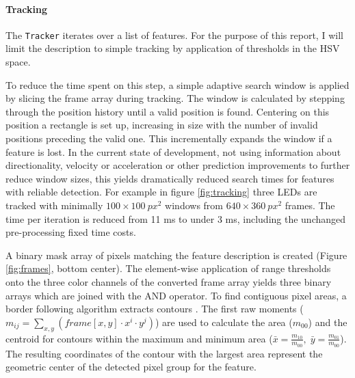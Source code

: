 \paragraph{Tracking}
\label{sec:Tracking}
The \texttt{Tracker} iterates over a list of features. For the purpose of this report, I will limit the description to simple tracking by application of thresholds in the HSV space. 

To reduce the time spent on this step, a simple adaptive search window is applied by slicing the frame array during tracking. The window is calculated by stepping through the position history until a valid position is found. Centering on this position a rectangle is set up, increasing in size with the number of invalid positions preceding the valid one. This incrementally expands the window if a feature is lost. In the current state of development, not using information about directionality, velocity or acceleration or other prediction improvements to further reduce window sizes, this yields dramatically reduced search times for features with reliable detection. For example in figure \ref{fig:tracking} three LEDs are tracked with minimally $100\times100~px^2$ windows from $640\times360~px^2$ frames. The time per iteration is reduced from 11 ms to under 3 ms, including the unchanged pre-processing fixed time costs.

A binary mask array of pixels matching the feature description is created (Figure \ref{fig:frames}, bottom center). The element-wise application of range thresholds onto the three color channels of the converted frame array yields three binary arrays which are joined with the AND operator. To find contiguous pixel areas, a border following algorithm extracts contours \cite{Suzuki1985}. The first raw moments ($m_{ij}=\sum_{x,y}(frame[x, y] \cdot x^i \cdot y^j)$) are used to calculate the area ($m_{00}$) and the centroid for contours within the maximum and minimum area ($\bar{x} = \frac{m_{10}}{m_{00}} , \; \bar{y} = \frac{m_{01}}{m_{00}}$). The resulting coordinates of the contour with the largest area represent the geometric center of the detected pixel group for the feature.

